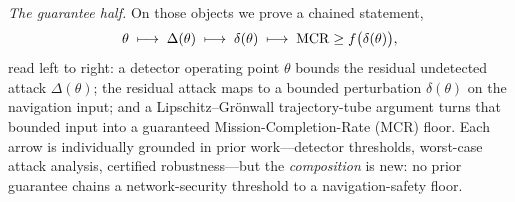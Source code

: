 \emph{The guarantee half.} On those objects we prove a chained statement,
\begin{equation}
\label{eq:chain}
\theta \;\longmapsto\; \Delta(\theta) \;\longmapsto\; \delta(\theta)
\;\longmapsto\; \mathrm{MCR} \ge f\big(\delta(\theta)\big),
\end{equation}
read left to right: a detector operating point $\theta$ bounds the residual
undetected attack $\Delta(\theta)$; the residual attack maps to a bounded
perturbation $\delta(\theta)$ on the navigation input; and a
Lipschitz--Gr\"onwall trajectory-tube argument turns that bounded input into a
guaranteed Mission-Completion-Rate (MCR) floor. Each arrow is individually
grounded in prior work---detector thresholds, worst-case attack analysis,
certified robustness---but the \emph{composition} is new: no prior guarantee
chains a network-security threshold to a navigation-safety floor.

